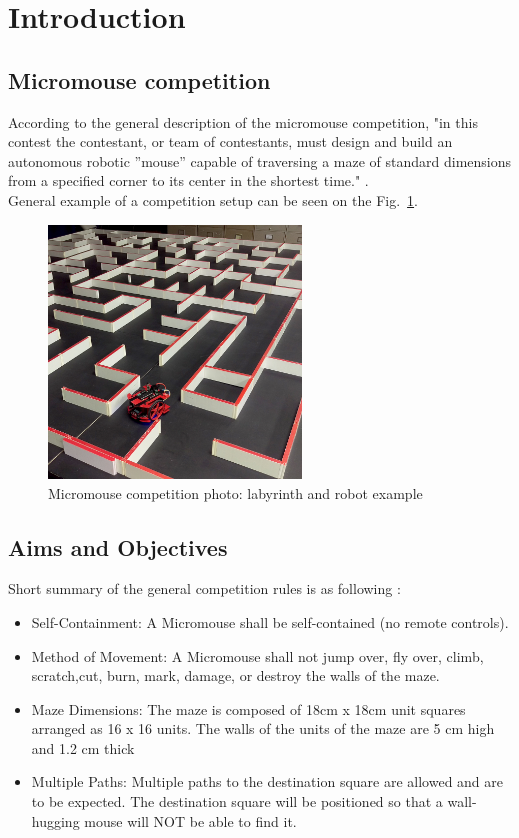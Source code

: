 
\section{Introduction}

\subsection{Micromouse competition}

According to the general description of the micromouse competition, "in this contest the contestant, or team of contestants, must design and build an autonomous robotic ”mouse” capable of traversing a maze of standard dimensions from a specified corner to its center in the shortest time." \cite{MicromouseRules}.\\
General example of a competition setup can be seen on the Fig.~\ref{fig:micromouse}. 
\begin{figure}[htb]
    \centering
    \includegraphics[width=0.6\textwidth]{figures/micromouse-maze.jpg}
    \caption{Micromouse competition photo: labyrinth and robot example \cite{MicromousePhotoLink}}
    \label{fig:micromouse}
\end{figure}

\subsection{Aims and Objectives}

    Short summary of the general competition rules is as following \cite{MicromouseRules}:

\begin{itemize}
    \item Self-Containment: A Micromouse shall be self-contained (no remote controls).
    \item Method of Movement: A Micromouse shall not jump over, fly over, climb, scratch,cut, burn, mark, damage, or destroy the walls of the maze.
    \item Maze Dimensions: The maze is composed of 18cm x 18cm unit squares arranged as 16 x 16 units. The walls of the units of the maze are 5 cm high and 1.2 cm thick 
    \item Multiple Paths: Multiple paths to the destination square are allowed and are to be expected. The destination square will be positioned so that a wall-hugging mouse will NOT be able to find it.
\end{itemize}
    
